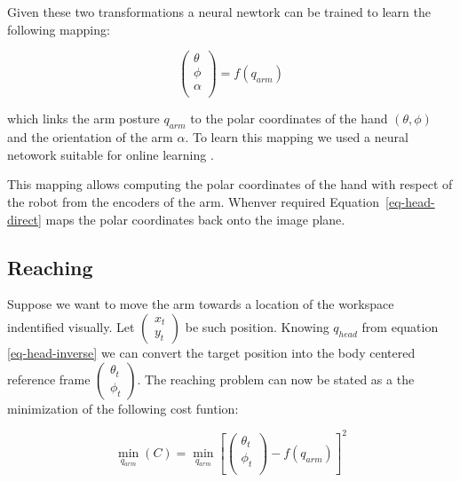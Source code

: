 Given these two transformations a neural newtork can be trained to 
learn the following mapping:

\begin{equation}
  \left(\begin{array}{c}
    \theta \\
    \phi \\
    \alpha \\ 
    \end{array}\right)
  = f \left(q_{arm}\right)
\label{eq-arm-direct}
\end{equation}

which links the arm posture $q_{arm}$ to the polar coordinates of the 
hand $\left(\theta, \phi\right)$ and the orientation of the arm $\alpha$.
To learn this mapping we used a neural netowork suitable for online
learning \cite{schaal98Constructive}.

This mapping allows computing the polar coordinates of the hand with 
respect of the robot from the encoders of the arm. Whenver required 
Equation~\ref{eq-head-direct} maps the polar coordinates back onto 
the image plane.

\subsection{Reaching}
\label{sec:reaching}
Suppose we want to move the arm towards a location of the workspace 
indentified visually. Let $\left(\begin{array}{c} x_t \\ y_t\end{array}\right)$
be such position. Knowing $q_{head}$ from equation \ref{eq-head-inverse} 
we can convert the target position into the body centered reference frame 
$\left(\begin{array}{c} \theta_t  \\ \phi_t\end{array}\right)$. The 
reaching problem can now be stated as a the minimization of the following 
cost funtion:

\begin{equation}
  \displaystyle\min_{q_{arm}}\left(C\right)=\displaystyle\min_{q_{arm}}\left[
  \left(
  \begin{array}{c}
    \theta_t \\
    \phi_t \\
    \end{array}\right)
  -f \left(q_{arm}\right)
  \right]^2
\label{eq-reaching1}
\end{equation}

